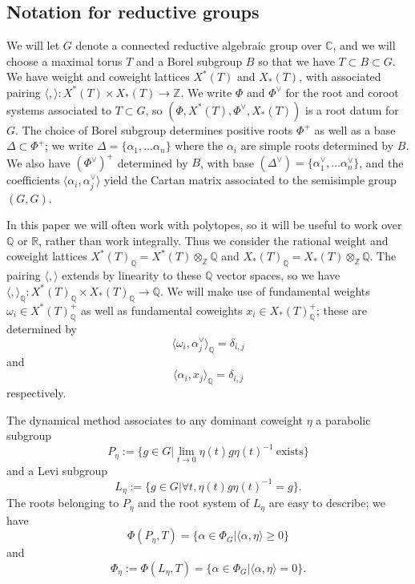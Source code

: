 \documentclass[12pt,reqno]{amsart}
\theoremstyle{definition}
\begin{document}
\subsection{Notation for reductive groups}
We will let $G$ denote a connected reductive algebraic group over $\mathbb{C}$, and we will choose a maximal torus $T$ and a Borel subgroup $B$ so that we have $T \subset B \subset G$. We have weight and coweight lattices $X^*(T)$ and $X_*(T)$, with associated pairing $\langle ,  \rangle : X^*(T) \times X_*(T) \rightarrow \mathbb{Z}$. We write $\Phi$ and $\Phi^{\vee}$ for the root and coroot systems associated to $T \subset G$, so $(\Phi, X^*(T), \Phi^{\vee}, X_*(T))$ is a root datum for $G$. The choice of Borel subgroup determines positive roots $\Phi^+$ as well as a base $\Delta \subset \Phi^+$; we write $\Delta=\{ \alpha_1, \dots \alpha_n \}$ where the $\alpha_i$ are simple roots determined by $B$. We also have $(\Phi^{\vee})^+$ determined by $B$, with base $(\Delta^{\vee})=\{\alpha_1^{\vee}, \dots \alpha_n^{\vee} \}$, and the coefficients $\langle \alpha_i, \alpha_j^{\vee} \rangle $ yield the Cartan matrix associated to the semisimple group $(G,G)$.

In this paper we will often work with polytopes, so it will be useful to work over $\mathbb{Q}$ or $\mathbb{R}$, rather than work integrally. Thus we consider the rational weight and coweight lattices $X^*(T)_{\mathbb{Q}}= X^*(T) \otimes_{\mathbb{Z}} \mathbb{Q}$ and $X_*(T)_\mathbb{Q}=X_*(T) \otimes_{\mathbb{Z}} \mathbb{Q}$. The pairing $\langle, \rangle$ extends by linearity to these $\mathbb{Q}$ vector spaces, so we have $\langle ,\rangle_{\mathbb{Q}} :X^*(T)_{\mathbb{Q}} \times X_*(T)_{\mathbb{Q}} \rightarrow \mathbb{Q}$. We will make use of fundamental weights $\omega_i \in X^*(T)_{\mathbb{Q}}^+$ as well as fundamental coweights $x_i \in X_*(T)_{\mathbb{Q}}^+$; these are determined by \[ \langle \omega_i, \alpha_j^{\vee} \rangle_{\mathbb{Q}}= \delta_{i,j} \] and \[\langle \alpha_i, x_j \rangle_{\mathbb{Q}} = \delta_{i,j}\] respectively. 


The dynamical method associates to any dominant coweight $\eta$ a parabolic subgroup \[P_{\eta}:= \{g \in G | \lim_{t \rightarrow 0} \eta(t)g\eta(t)^{-1} ~\mathrm{exists} \}\] and a Levi subgroup \[L_{\eta}:= \{g \in G |\forall t,  \eta(t) g \eta(t)^{-1}=g \}.\]
The roots belonging to $P_{\eta}$ and the root system of $L_{\eta}$ are easy to describe; we have \[\Phi(P_{\eta}, T)=\{ \alpha \in \Phi_G| \langle \alpha, \eta \rangle \geq 0 \}\] and \[\Phi_{\eta}:=\Phi(L_{\eta}, T)=\{\alpha \in \Phi_G| \langle \alpha, \eta \rangle = 0\}.\]
\end{document}

